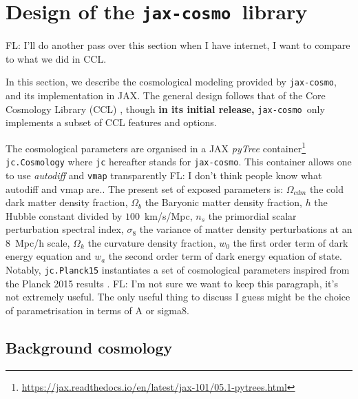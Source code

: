 \documentclass[twocolumn,twocolappendix,nofootinbib,iop]{openjournal}
\newcommand{\FrL}[1]{{\color{cyan}FL: #1}}
\newcommand{\jaxcosmo}{\texttt{jax-cosmo}}
\begin{document}
\section{Design of the \jaxcosmo\ library}
\label{sec-jaxcosmo-design}
\FrL{I'll do another pass over this section when I have internet, I want to compare to what we did in CCL.}

In this section, we describe the cosmological modeling provided by \jaxcosmo, and its implementation in JAX. The general design follows that of the Core Cosmology Library (CCL) \citep{2019ApJS..242....2C}, though \textbf{in its initial release, }
 \jaxcosmo\ only implements a subset of CCL features and options.
 
The cosmological parameters are organised in a JAX \textit{pyTree} container\footnote{\url{https://jax.readthedocs.io/en/latest/jax-101/05.1-pytrees.html}} \texttt{jc.Cosmology} where \texttt{jc} hereafter stands for \jaxcosmo. This container allows one to use \textit{autodiff} and \texttt{vmap} transparently \FrL{I don't think people know what autodiff and vmap are.}. The present set of exposed parameters is: $\Omega_{cdm}$ the cold dark matter density fraction, $\Omega_b$ the Baryonic matter density fraction, $h$ the Hubble constant divided by $100$~km/s/Mpc, $n_s$ the primordial scalar perturbation spectral index, $\sigma_8$ the variance of matter density perturbations at an $8$~Mpc/h scale, $\Omega_k$ the curvature density fraction, $w_0$ the first order term of dark energy equation and $w_a$ the second order term of dark energy equation of state. Notably, \texttt{jc.Planck15} instantiates a set of cosmological parameters inspired from the Planck 2015 results \citep{2016A&A...594A..13P}. 
\FrL{I'm not sure we want to keep this paragraph, it's not extremely useful. The only useful thing to discuss I guess might be the choice of parametrisation in terms of A or sigma8.}


\subsection{Background cosmology}
\end{document}
